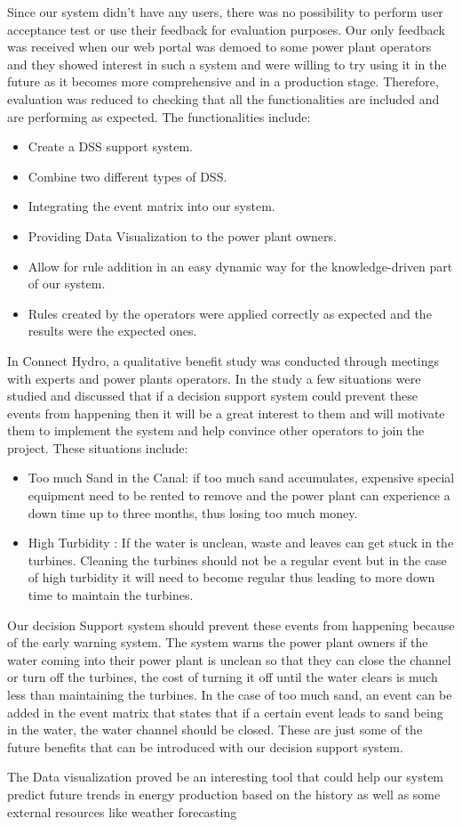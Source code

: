 Since our system didn't have any users, there was no possibility to perform user acceptance test or use their feedback for evaluation purposes. Our only feedback was received when our web portal was demoed to some power plant operators and they showed interest in such a system and were willing to try using it in the future as it becomes more comprehensive and in a production stage. Therefore, evaluation was reduced to checking that all the functionalities are included and are performing as expected. The functionalities include:
\begin{itemize}
	\item Create a DSS support system.
	\item Combine two different types of DSS.
	\item Integrating the event matrix into our system.
	\item Providing Data Visualization to the power plant owners.
	\item Allow for rule addition in an easy dynamic way for the knowledge-driven part of our system.
	\item Rules created by the operators were applied correctly as expected and the results were the expected ones.
\end{itemize}
In Connect Hydro, a qualitative benefit study was conducted through meetings with experts and power plants operators. In the study a few situations were studied and discussed that if a decision support system could prevent these events from happening then it will be a great interest to them and will motivate them to implement the system and help convince other operators to join the project. These situations include:
\begin{itemize}
	\item Too much Sand in the Canal: if too much sand accumulates, expensive special equipment need to be rented to remove and the power plant can experience a down time up to three months, thus losing too much money.
	\item High Turbidity : If the water is unclean, waste and leaves can get stuck in the turbines. Cleaning the turbines should not be a regular event but in the case of high turbidity it will need to become regular thus leading to more down time to maintain the turbines.
\end{itemize}
Our decision Support system should prevent these events from happening because of the early warning system. The system warns the power plant owners if the water coming into their power plant is unclean so that they can close the channel or turn off the turbines, the cost of turning it off until the water clears is much less than maintaining the turbines. In the case of too much sand, an event can be added in the event matrix that states that if a certain event leads to sand being in the water, the water channel should be closed. These are just some of the future benefits that can be introduced with our decision support system.

The Data visualization proved be an interesting tool that could help our system predict future trends in energy production based on the history as well as some external resources like weather forecasting